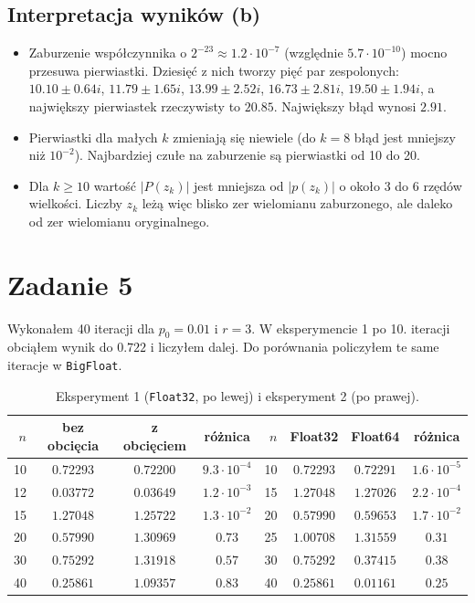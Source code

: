 \documentclass[11pt,a4paper]{article}
\begin{document}
\subsection*{Interpretacja wyników (b)}
\begin{itemize}
    \item Zaburzenie współczynnika o $2^{-23} \approx 1.2 \cdot 10^{-7}$ (względnie $5.7 \cdot 10^{-10}$) mocno przesuwa pierwiastki. Dziesięć z nich tworzy pięć par zespolonych: $10.10 \pm 0.64i$, $11.79 \pm 1.65i$, $13.99 \pm 2.52i$, $16.73 \pm 2.81i$, $19.50 \pm 1.94i$, a największy pierwiastek rzeczywisty to $20.85$. Największy błąd wynosi $2.91$.
    \item Pierwiastki dla małych $k$ zmieniają się niewiele (do $k = 8$ błąd jest mniejszy niż $10^{-2}$). Najbardziej czułe na zaburzenie są pierwiastki od 10 do 20.
    \item Dla $k \ge 10$ wartość $|P(z_k)|$ jest mniejsza od $|p(z_k)|$ o około 3 do 6 rzędów wielkości. Liczby $z_k$ leżą więc blisko zer wielomianu zaburzonego, ale daleko od zer wielomianu oryginalnego.
\end{itemize}


\section{Zadanie 5}

Wykonałem 40 iteracji dla $p_0 = 0.01$ i $r = 3$. W eksperymencie 1 po 10. iteracji obciąłem wynik do $0.722$ i liczyłem dalej. Do porównania policzyłem te same iteracje w \texttt{BigFloat}.

\begin{table}[H]
\centering
\small
\caption{Eksperyment 1 (\texttt{Float32}, po lewej) i eksperyment 2 (po prawej).}
\begin{tabular}{rccc@{\qquad}rccc}
\toprule
$n$ & \textbf{bez obcięcia} & \textbf{z obcięciem} & \textbf{różnica} & $n$ & \textbf{Float32} & \textbf{Float64} & \textbf{różnica} \\
\midrule
10 & $0.72293$ & $0.72200$ & $9.3 \cdot 10^{-4}$ & 10 & $0.72293$ & $0.72291$ & $1.6 \cdot 10^{-5}$ \\
12 & $0.03772$ & $0.03649$ & $1.2 \cdot 10^{-3}$ & 15 & $1.27048$ & $1.27026$ & $2.2 \cdot 10^{-4}$ \\
15 & $1.27048$ & $1.25722$ & $1.3 \cdot 10^{-2}$ & 20 & $0.57990$ & $0.59653$ & $1.7 \cdot 10^{-2}$ \\
20 & $0.57990$ & $1.30969$ & $0.73$ & 25 & $1.00708$ & $1.31559$ & $0.31$ \\
30 & $0.75292$ & $1.31918$ & $0.57$ & 30 & $0.75292$ & $0.37415$ & $0.38$ \\
40 & $0.25861$ & $1.09357$ & $0.83$ & 40 & $0.25861$ & $0.01161$ & $0.25$ \\
\bottomrule
\end{tabular}
\end{table}
\end{document}
